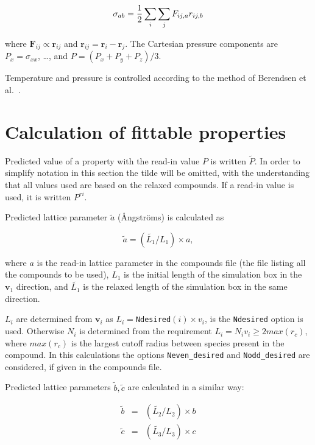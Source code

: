 \documentclass[a4paper,12pt,pdftex,onecolumn]{article}
\begin{document}
\begin{eqnarray}
\sigma_{ab} = {1\over 2} \sum_i \sum_j F_{ij,a} r_{ij,b}
\end{eqnarray}

where $\mathbf{F}_{ij} \propto \mathbf{r}_{ij}$ and $\mathbf{r}_{ij}=\mathbf{r}_{i}-\mathbf{r}_{j}$.
The Cartesian pressure components are $P_x = \sigma_{xx}$, \ldots, and
$P=(P_x+P_y+P_z)/3$.

Temperature and pressure is controlled according to the method of
Berendsen et al.~\cite{berendsen1984}.




\section{Calculation of fittable properties}


Predicted value of a property with the read-in value $P$ is written
$\widetilde{P}$. In order to simplify notation in this section the
tilde will be omitted, with the understanding that all values used
are based on the relaxed compounds. If a read-in value is used,
it is written $P^{ri}$.

Predicted lattice parameter $\widetilde{a}$ (\AA{}ngstr\"oms) is calculated as

\begin{equation}
\widetilde{a} = (\widetilde{L_1} / L_1) \times a,
\end{equation}

where $a$ is the read-in lattice parameter in the compounds file
(the file listing all the compounds to be used),
$L_1$ is the initial length of the simulation box in the $\mathbf{v}_1$ direction, and
$\widetilde{L_1}$ is the relaxed length of the simulation box in the same direction.


$L_i$ are determined from $\mathbf{v}_i$ as $L_i = $\verb+Ndesired+$(i) \times v_i$,
is the \verb+Ndesired+ option is used. Otherwise $N_i$ is determined from the requirement
$L_i = N_i v_i \ge 2 max(r_c)$, where $max(r_c)$ is the largest cutoff radius between
species present in the compound. In this calculations the options \verb+Neven_desired+ and
\verb+Nodd_desired+ are considered, if given in the compounds file.

Predicted lattice parameters $\widetilde{b}, \widetilde{c}$ are calculated
in a similar way:

\begin{eqnarray}
\widetilde{b} &=& (\widetilde{L_2} / L_2) \times b \\
\widetilde{c} &=& (\widetilde{L_3} / L_3) \times c \\
\end{eqnarray}
\end{document}
